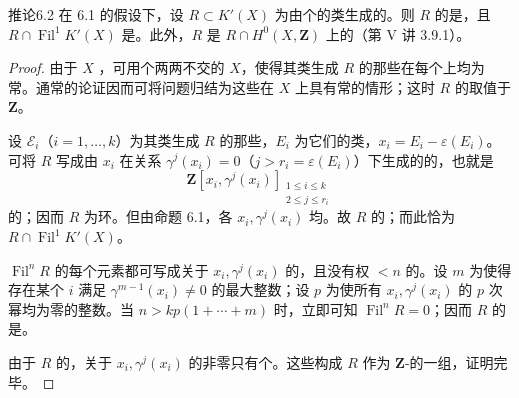 \begin{SGAresult}{推论}{6.2}
在 6.1 的假设下，设 $R\subset K'(X)$ 为由个的类生成的。则 $R$ 的是，且 $R\cap\operatorname{Fil}^1K'(X)$ 是。此外，$R$ 是 $R\cap H^0(X,\mathbf Z)$ 上的（第 V 讲 3.9.1）。
\end{SGAresult}
\begin{proof}
由于 $X$ ，可用个两两不交的 $X$，使得其类生成 $R$ 的那些在每个上均为常。通常的论证因而可将问题归结为这些在 $X$ 上具有常的情形；这时 $R$ 的取值于 $\mathbf Z$。

设 $\mathcal E_i$（$i=1,\ldots,k$）为其类生成 $R$ 的那些，$E_i$ 为它们的类，$x_i=E_i-\varepsilon(E_i)$。可将 $R$ 写成由 $x_i$ 在关系 $\gamma^j(x_i)=0$（$j>r_i=\varepsilon(E_i)$）下生成的的，也就是
\[
\mathbf Z[x_i,\gamma^j(x_i)]_{\substack{1\leq i\leq k\\2\leq j\leq r_i}}
\]
的；因而 $R$ 为环。但由命题 6.1，各 $x_i,\gamma^j(x_i)$ 均。故 $R$ 的；而此恰为 $R\cap\operatorname{Fil}^1K'(X)$。

$\operatorname{Fil}^nR$ 的每个元素都可写成关于 $x_i,\gamma^j(x_i)$ 的，且没有权 $<n$ 的。设 $m$ 为使得存在某个 $i$ 满足 $\gamma^{m-1}(x_i)\ne0$ 的最大整数；设 $p$ 为使所有 $x_i,\gamma^j(x_i)$ 的 $p$ 次幂均为零的整数。当 $n>kp(1+\cdots+m)$ 时，立即可知 $\operatorname{Fil}^nR=0$；因而 $R$ 的是。

由于 $R$ 的，关于 $x_i,\gamma^j(x_i)$ 的非零只有个。这些构成 $R$ 作为 $\mathbf Z$-的一组，证明完毕。
\end{proof}

